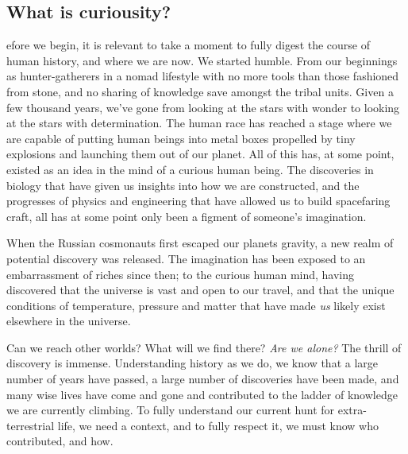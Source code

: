 \subsection*{What is curiousity?}
efore we begin, it is relevant to take a moment to fully digest the course of human history, and where we are now.
We started humble.
From our beginnings as hunter-gatherers in a nomad lifestyle with no more tools than those fashioned from stone, and no sharing of knowledge save amongst the tribal units.
Given a few thousand years, we've gone from looking at the stars with wonder to looking at the stars with determination.
The human race has reached a stage where we are capable of putting human beings into metal boxes propelled by tiny explosions and launching them out of our planet.
All of this has, at some point, existed as an idea in the mind of a curious human being.
The discoveries in biology that have given us insights into how we are constructed, and the progresses of physics and engineering that have allowed us to build spacefaring craft, all has at some point only been a figment of someone's imagination.

When the Russian cosmonauts first escaped our planets gravity, a new realm of potential discovery was released.
The imagination has been exposed to an embarrassment of riches since then; to the curious human mind, having discovered that the universe is vast and open to our travel, and that the unique conditions of temperature, pressure and matter that have made \textit{us} likely exist elsewhere in the universe.

Can we reach other worlds?
What will we find there?
\textit{Are we alone?}
The thrill of discovery is immense.
Understanding history as we do, we know that a large number of years have passed, a large number of discoveries have been made, and many wise lives have come and gone and contributed to the ladder of knowledge we are currently climbing.
To fully understand our current hunt for extra-terrestrial life, we need a context, and to fully respect it, we must know who contributed, and how.